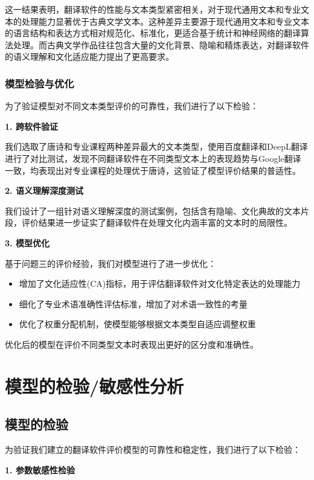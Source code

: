 \documentclass[bwprint]{cumcmthesis}
\begin{document}
这一结果表明，翻译软件的性能与文本类型紧密相关，对于现代通用文本和专业文本的处理能力显著优于古典文学文本。这种差异主要源于现代通用文本和专业文本的语言结构和表达方式相对规范化、标准化，更适合基于统计和神经网络的翻译算法处理。而古典文学作品往往包含大量的文化背景、隐喻和精炼表达，对翻译软件的语义理解和文化适应能力提出了更高要求。

\subsubsection{模型检验与优化}
为了验证模型对不同文本类型评价的可靠性，我们进行了以下检验：

\textbf{1. 跨软件验证}

我们选取了唐诗和专业课程两种差异最大的文本类型，使用百度翻译和DeepL翻译进行了对比测试，发现不同翻译软件在不同类型文本上的表现趋势与Google翻译一致，均表现出对专业课程的处理优于唐诗，这验证了模型评价结果的普适性。

\textbf{2. 语义理解深度测试}

我们设计了一组针对语义理解深度的测试案例，包括含有隐喻、文化典故的文本片段，评价结果进一步证实了翻译软件在处理文化内涵丰富的文本时的局限性。

\textbf{3. 模型优化}

基于问题三的评价经验，我们对模型进行了进一步优化：
\begin{itemize}
    \item 增加了文化适应性(CA)指标，用于评估翻译软件对文化特定表达的处理能力
    \item 细化了专业术语准确性评估标准，增加了对术语一致性的考量
    \item 优化了权重分配机制，使模型能够根据文本类型自适应调整权重
\end{itemize}

优化后的模型在评价不同类型文本时表现出更好的区分度和准确性。


\section{模型的检验/敏感性分析}

\subsection{模型的检验}
为验证我们建立的翻译软件评价模型的可靠性和稳定性，我们进行了以下检验：

\textbf{1. 参数敏感性检验}
\end{document}
